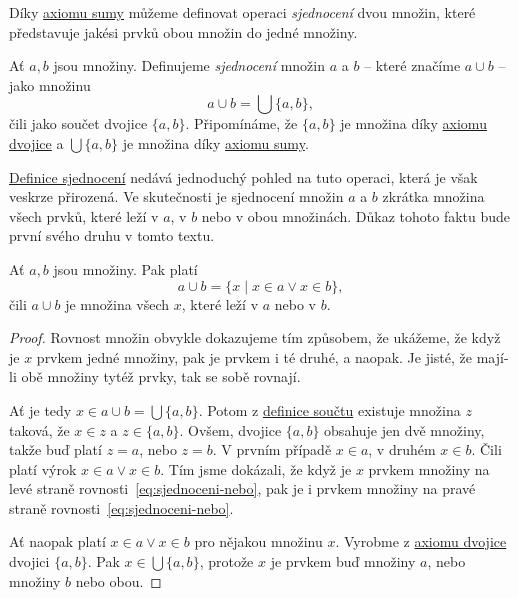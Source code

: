Díky \hyperref[eq:axiom-sumy]{axiomu sumy} můžeme definovat operaci
\emph{sjednocení} dvou množin, které představuje jakési  prvků obou
množin do jedné množiny.

\begin{definition}
  \label{def:sjednoceni-mnozin}
  Ať $a, b$ jsou množiny. Definujeme \emph{sjednocení} množin $a$ a $b$ -- které
  značíme $a \cup b$ -- jako množinu
  \[
    a \cup b = \bigcup \{a, b\},
  \]
  čili jako součet dvojice $\{a, b\}$. Připomínáme, že $\{a, b\}$ je množina
  díky \hyperref[eq:axiom-dvojice]{axiomu dvojice} a $\bigcup \{a, b\}$ je
  množina díky \hyperref[eq:axiom-sumy]{axiomu sumy}.
\end{definition}

\hyperref[def:sjednoceni-mnozin]{Definice sjednocení} nedává jednoduchý pohled
na tuto operaci, která je však veskrze přirozená. Ve skutečnosti je sjednocení
množin $a$ a $b$ zkrátka množina všech prvků, které leží v $a$, v $b$ nebo v
obou množinách. Důkaz tohoto faktu bude první svého druhu v tomto textu.

\begin{lemma}
  \label{lem:o-sjednoceni-mnozin}
  Ať $a, b$ jsou množiny. Pak platí
  \begin{equation}
    \label{eq:sjednoceni-nebo}
    a \cup b = \{x \mid x \in a \vee x \in b\},
  \end{equation}
  čili $a \cup b$ je množina všech $x$, které leží v $a$ nebo v $b$.
\end{lemma}
\begin{proof}
  Rovnost množin obvykle dokazujeme tím způsobem, že ukážeme, že když je $x$
  prvkem jedné množiny, pak je prvkem i té druhé, a naopak. Je jisté, že mají-li
  obě množiny tytéž prvky, tak se sobě rovnají.

  Ať je tedy $x \in a \cup b = \bigcup \{a, b\}$. Potom z
  \hyperref[def:soucet-mnoziny]{definice součtu} existuje množina $z$ taková, že
  $x \in z$ a $z \in \{a, b\}$. Ovšem, dvojice $\{a, b\}$ obsahuje jen dvě
  množiny, takže buď platí $z = a$, nebo $z = b$. V prvním případě $x \in a$, v
  druhém $x \in b$. Čili platí výrok $x \in a \vee x \in b$. Tím jsme dokázali,
  že když je $x$ prvkem množiny na levé straně
  rovnosti~\eqref{eq:sjednoceni-nebo}, pak je i prvkem množiny na pravé straně
  rovnosti~\eqref{eq:sjednoceni-nebo}.

  Ať naopak platí $x \in a \vee x \in b$ pro nějakou množinu $x$. Vyrobme z
  \hyperref[eq:axiom-dvojice]{axiomu dvojice} dvojici $\{a, b\}$. Pak $x \in
  \bigcup \{a, b\}$, protože $x$ je prvkem buď množiny $a$, nebo množiny $b$
  nebo obou.
\end{proof}

